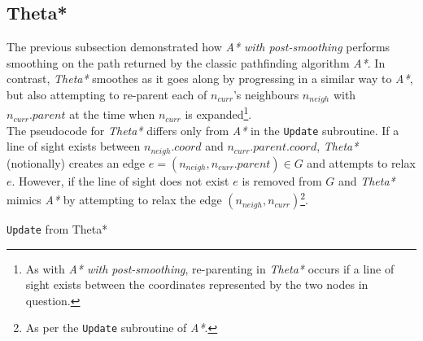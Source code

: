\documentclass[12pt,notitlepage]{report}
\begin{document}
\subsection {Theta*}

The previous subsection demonstrated how {\em A* with post-smoothing} performs smoothing on the path returned by the classic pathfinding algorithm {\em A*}. In contrast, {\em Theta*} smoothes as it goes along by progressing in a similar way to {\em A*}, but also attempting to re-parent each of $n_{curr}$'s neighbours $n_{neigh}$ with $n_{curr}.parent$ at the time when $n_{curr}$ is expanded\footnote{As with {\em A* with post-smoothing}, re-parenting in {\em Theta*} occurs if a line of sight exists between the coordinates represented by the two nodes in question.}.\\

\noindent
The pseudocode for {\em Theta*} differs only from {\em A*} in the {\tt Update} subroutine. If a line of sight exists between $n_{neigh}.coord$ and $n_{curr}.parent.coord$, {\em Theta*} (notionally) creates an edge $e = (n_{neigh}, n_{curr}.parent)  \in G$ and attempts to relax $e$. However, if the line of sight does not exist $e$ is removed from $G$ and {\em Theta*} mimics {\em A*} by attempting to relax the edge $(n_{neigh},n_{curr})$\footnote{As per the {\tt Update} subroutine of {\em A*}.}.

\begin{algorithm}
  \SetAlgoLined\DontPrintSemicolon
  \caption{{\tt Update} from {\sc Theta*}}
\end{algorithm} 
\end{document}
